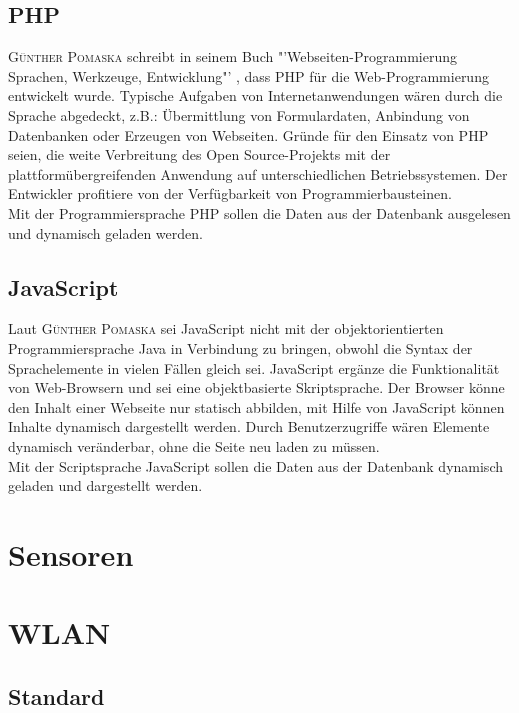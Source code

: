 \subsection{\ac{PHP}}
\textsc{Günther Pomaska} schreibt in seinem Buch "'Webseiten-Programmierung Sprachen, Werkzeuge, Entwicklung"' \cite{pomaska2012webseiten-programmierung}, dass \ac{PHP} für die Web-Programmierung entwickelt wurde. Typische Aufgaben von Internetanwendungen wären durch die Sprache abgedeckt, z.B.: Übermittlung von Formulardaten, Anbindung von Datenbanken oder Erzeugen von Webseiten. Gründe für den Einsatz von \ac{PHP} seien, die weite Verbreitung des Open Source-Projekts mit der plattformübergreifenden Anwendung auf unterschiedlichen Betriebssystemen. Der Entwickler profitiere von der Verfügbarkeit von Programmierbausteinen.\\
Mit der Programmiersprache \ac{PHP} sollen die Daten aus der Datenbank ausgelesen und dynamisch geladen werden.

\subsection{JavaScript}
Laut \textsc{Günther Pomaska} \cite{pomaska2012webseiten-programmierung} sei JavaScript nicht mit der objektorientierten Programmiersprache Java in Verbindung zu bringen, obwohl die Syntax der Sprachelemente in vielen Fällen gleich sei. JavaScript ergänze die Funktionalität von Web-Browsern und sei eine objektbasierte Skriptsprache. Der Browser könne den Inhalt einer Webseite nur statisch abbilden, mit Hilfe von JavaScript können Inhalte dynamisch dargestellt werden. Durch Benutzerzugriffe wären Elemente dynamisch veränderbar, ohne die Seite neu laden zu müssen.\\
Mit der Scriptsprache JavaScript sollen die Daten aus der Datenbank dynamisch geladen und dargestellt werden.

\section{Sensoren}\label{Sensoren_Planung}


\section{WLAN}
\subsection{Standard}
 

